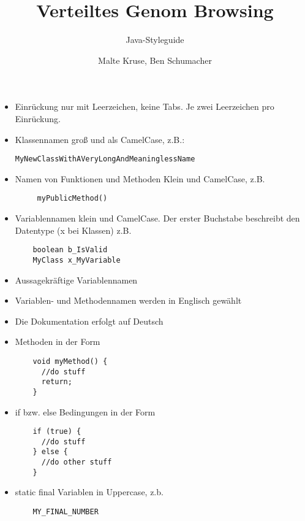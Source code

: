\documentclass{scrartcl}
\title{Verteiltes Genom Browsing}
\subtitle{Java-Styleguide}
\author{Malte Kruse, Ben Schumacher}
\begin{document}
\pagestyle{fancy}
\cfoot{}
\rfoot{\pagemark}
\maketitle
\thispagestyle{empty}
\newpage

\begin{itemize}
\item Einrückung nur mit Leerzeichen, keine Tabs. Je zwei Leerzeichen pro Einrückung.
\item  Klassennamen groß und als CamelCase, z.B.:
\begin{lstlisting}
MyNewClassWithAVeryLongAndMeaninglessName
\end{lstlisting}
\item  Namen von Funktionen und Methoden Klein und CamelCase, z.B.
\begin{lstlisting}
     myPublicMethod()
\end{lstlisting}
\item Variablennamen klein und CamelCase. Der erster Buchstabe beschreibt den\\
Datentype (x bei Klassen) z.B.
\begin{lstlisting}
	boolean b_IsValid
	MyClass x_MyVariable
\end{lstlisting}
\item Aussagekräftige Variablennamen
\item Variablen- und Methodennamen werden in Englisch gewählt
\item Die Dokumentation erfolgt auf Deutsch
\item Methoden in der Form
\begin{lstlisting}
	void myMethod() {
	  //do stuff
	  return;
	}
\end{lstlisting}
\item if bzw. else Bedingungen in der Form
\begin{lstlisting}
	if (true) {
	  //do stuff
	} else {
	  //do other stuff
	} 
\end{lstlisting}
\item static final Variablen in Uppercase, z.b.
\begin{lstlisting}
	MY_FINAL_NUMBER
\end{lstlisting}
\end{itemize}
\end{document}

